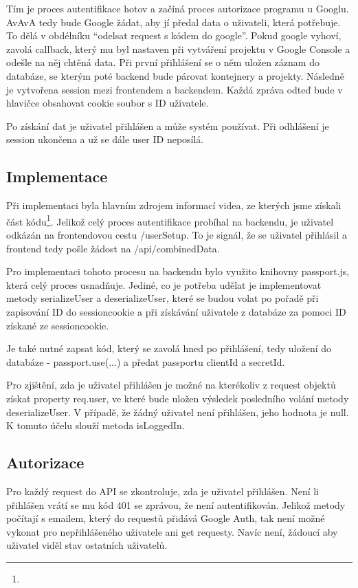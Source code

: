 \documentclass[a4paper,oneside,12pt]{report}
\begin{document}
Tím je proces autentifikace hotov a začíná proces autorizace programu u Googlu.
AvAvA tedy bude Google žádat, aby jí předal data o uživateli, která potřebuje.
To dělá v obdélníku “odelsat request s kódem do google”.
Pokud google vyhoví, zavolá callback, který mu byl nastaven při vytváření projektu v Google Console a odešle na něj chtěná data.
Při první přihlášení se o něm uložen záznam do databáze, se kterým poté backend bude párovat kontejnery a projekty.
Následně je vytvořena session mezi frontendem a backendem. Každá zpráva odteď bude v hlavičce obsahovat cookie soubor s ID uživatele.

Po získání dat je uživatel přihlášen a může systém používat. Při odhlášení je session ukončena a už se dále user ID neposílá.

\subsection{Implementace}


Při implementaci byla hlavním zdrojem informací videa, ze kterých jsme získali část kódu\footnote{}.
Jelikož celý proces autentifikace probíhal na backendu, je uživatel odkázán na frontendovou cestu /userSetup. To je signál, že se uživatel přihlásil a frontend tedy pošle žádost na /api/combinedData.

Pro implementaci tohoto procesu na backendu bylo využito knihovny passport.js, která celý proces usnadňuje. Jediné, co je potřeba udělat je implementovat metody serializeUser a deserializeUser, které se budou volat po pořadě při zapisování ID do sessioncookie a při získávání uživatele z databáze za pomoci ID získané ze sessioncookie.

Je také nutné zapsat kód, který se zavolá hned po přihlášení, tedy uložení do databáze - passport.use(...) a předat passportu clientId a secretId.

Pro zjištění, zda je uživatel přihlášen je možné na kterékoliv z request objektů získat property req.user, ve které bude uložen výsledek posledního volání metody deserializeUser. V případě, že žádný uživatel není přihlášen, jeho hodnota je null. K tomuto účelu slouží metoda isLoggedIn.


\subsection{Autorizace}

Pro každý request do API se zkontroluje, zda je uživatel přihlášen.
Není li přihlášen vrátí se mu kód 401 se zprávou, že není autentifikován.
Jelikož metody počítají s emailem, který do requestů přidává Google Auth, tak není možné vykonat pro nepřihlášeného uživatele ani get requesty.
Navíc není, žádoucí aby uživatel viděl stav ostatních uživatelů.
\end{document}
